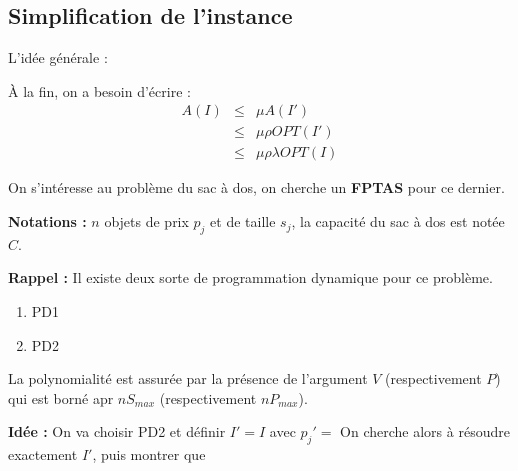 \documentclass[a4paper, 11pt]{thesis}
\begin{document}
\subsection{Simplification de l'instance}

L'idée générale : %

À la fin, on a besoin d'écrire : \begin{displaymath}
    \begin{array}{rcl}
        A(I) & \leq & \mu A(I') \\
             & \leq & \mu \rho OPT(I') \\
             & \leq & \mu \rho \lambda OPT(I)
    \end{array}
\end{displaymath}

\begin{ex}
    On s'intéresse au problème du sac à dos, on cherche un \textbf{FPTAS} pour ce dernier.
    
    \textbf{Notations :} $n$ objets de prix $p_j$ et de taille $s_j$, la capacité du sac à dos est
    notée $C$.

    \textbf{Rappel :} Il existe deux sorte de programmation dynamique pour ce problème.
    \begin{enumerate}
        \item PD1%
        \item PD2%
    \end{enumerate}

    La polynomialité est assurée par la présence de l'argument $V$ (respectivement $P$) qui est
    borné apr $nS_{max}$ (respectivement $nP_{max}$).

    \textbf{Idée :} On va choisir PD2 et définir $I' = I$ avec $p_j' = $%
    On cherche alors à résoudre exactement $I'$, puis montrer que %


\end{ex}
\end{document}
